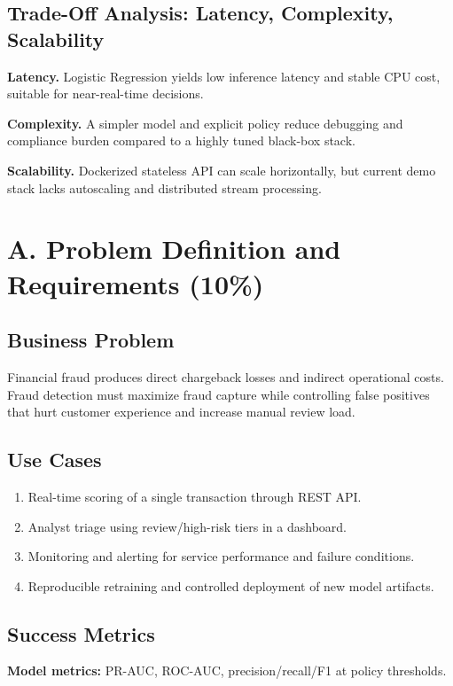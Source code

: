 \documentclass[11pt]{article}
\begin{document}
\subsection{Trade-Off Analysis: Latency, Complexity, Scalability}
\textbf{Latency.} Logistic Regression yields low inference latency and stable CPU cost, suitable for near-real-time decisions.

\textbf{Complexity.} A simpler model and explicit policy reduce debugging and compliance burden compared to a highly tuned black-box stack.

\textbf{Scalability.} Dockerized stateless API can scale horizontally, but current demo stack lacks autoscaling and distributed stream processing.

\section{A. Problem Definition and Requirements (10\%)}

\subsection{Business Problem}
Financial fraud produces direct chargeback losses and indirect operational costs. Fraud detection must maximize fraud capture while controlling false positives that hurt customer experience and increase manual review load.

\subsection{Use Cases}
\begin{enumerate}
\item Real-time scoring of a single transaction through REST API.
\item Analyst triage using review/high-risk tiers in a dashboard.
\item Monitoring and alerting for service performance and failure conditions.
\item Reproducible retraining and controlled deployment of new model artifacts.
\end{enumerate}

\subsection{Success Metrics}
\textbf{Model metrics:} PR-AUC, ROC-AUC, precision/recall/F1 at policy thresholds.
\end{document}

